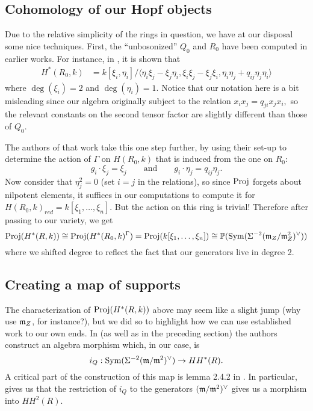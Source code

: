 \documentclass [11pt, proquest] {uwthesis}[2020/02/24]
\begin{document}
\subsection{Cohomology of our Hopf objects}\label{sec:cohomology-R}
    Due to the relative simplicity of the rings in question, we have at our disposal some nice techniques. First, the ``unbosonized'' $Q_0$ and $R_0$ have been computed in earlier works. For instance, in \cite[thm. 4.1]{mpsw09}, it is shown that
    \begin{align*}
        H^\ast(R_0,k)&=k[\xi_i,\eta_i]/\langle\eta_i\xi_j-\xi_j\eta_i, \xi_i\xi_j-\xi_j\xi_i, \eta_i\eta_j+q_{ij}\eta_j\eta_i\rangle
    \end{align*}
    where $\deg(\xi_i)=2$ and $\deg(\eta_i)=1.$ Notice that our notation here is a bit misleading since our algebra originally subject to the relation $x_ix_j=q_{ji}x_jx_i,$ so the relevant constants on the second tensor factor are slightly different than those of $Q_0$. 
    
    The authors of that work take this one step further, by using their set-up to determine the action of $\Gamma$ on $H(R_0,k)$ that is induced from the one on $R_0:$
    \[g_i\cdot\xi_j = \xi_j\qquad\text{and}\qquad g_i\cdot\eta_j=q_{ij}\eta_j.\]
    Now consider that $\eta_j^2=0$ (set $i=j$ in the relations), so since $\operatorname{Proj}$ forgets about nilpotent elements, it suffices in our computations to compute it for $H(R_0,k)_{red}=k[\xi_1,\dots,\xi_n].$ But the action on this ring is trivial! Therefore after passing to our variety, we get
    \[\operatorname{Proj}(H^\ast(R,k))\cong\operatorname{Proj}(H^\ast(R_0,k)^\Gamma)=\operatorname{Proj}(k[\xi_1,\dots,\xi_n])\cong \mathbb{P}(\operatorname{Sym}(\Sigma^{-2}(\mathfrak{m}_Z/\mathfrak{m}_Z^2)^\vee))\]
    where we shifted degree to reflect the fact that our generators live in degree 2.
\subsection{Creating a map of supports}
    The characterization of $\operatorname{Proj}(H^\ast(R,k))$ above may seem like a slight jump (why use $\mathfrak{m}_Z$, for instance?), but we did so to highlight how we can use established work to our own ends. In \cite[def. 3.6]{negron-pevtsovaI} (as well as in the preceding section) the authors construct an algebra morphism which, in our case, is
    \[i_{Q}:\operatorname{Sym}(\Sigma^{-2}(\mathfrak{m}/\mathfrak{m}^2)^\vee)\to HH^\ast(R).\]
    A critical part of the construction of this map is lemma 2.4.2 in \cite{bezrukavnikov-ginzburg07}. In particular, \cite[thm. 3.5]{negron-pevtsovaII} gives us that the restriction of $i_Q$ to the generators $(\mathfrak{m}/\mathfrak{m}^2)^\vee$ gives us a morphism into $HH^2(R).$
    
\end{document}
